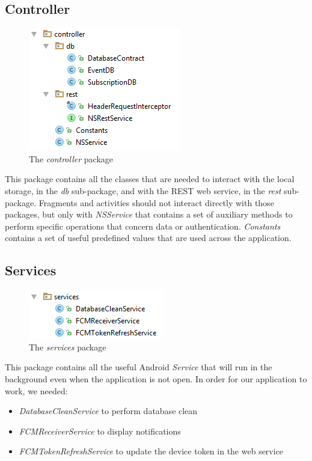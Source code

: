 \documentclass[a4paper]{scrreprt}
\begin{document}
\subsection{Controller}
\begin{figure}[H]
	\centering
	\includegraphics{pack_controller}
	\caption{The \emph{controller} package}
\end{figure}
This package contains all the classes that are needed to interact with the local storage, in the \emph{db} sub-package, and with the REST web service, in the \emph{rest} sub-package. Fragments and activities should not interact directly with those packages, but only with \emph{NSService} that contains a set of auxiliary methods to perform specific operations that concern data or authentication. \emph{Constants} contains a set of useful predefined values that are used across the application.

\subsection{Services}
\begin{figure}[H]
	\centering
	\includegraphics{pack_services}
	\caption{The \emph{services} package}
\end{figure}
This package contains all the useful Android \emph{Service} that will run in the background even when the application is not open. In order for our application to work, we needed:
\begin{itemize}
	\item \emph{DatabaseCleanService} to perform database clean
	\item \emph{FCMReceiverService} to display notifications
	\item \emph{FCMTokenRefreshService} to update the device token in the web service
\end{itemize}
\end{document}
